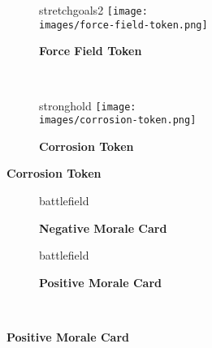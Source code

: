 \begin{figure}[H]
\begin{subfigure}[c]{0.15\linewidth}
\begin{expansionmini}{stretchgoals2}
      \texttt{[image: \\images/force-field-token.png]}
      \caption{\textbf{Force Field Token}}
    \end{expansionmini}
  \end{subfigure}
  ~
  \begin{subfigure}[c]{0.15\linewidth}
    \begin{expansionmini}{stronghold}
      \centering
      \vspace{0.5em}
      \texttt{[image: \\images/corrosion-token.png]}
      \caption{\textbf{Corrosion Token}}
    \end{expansionmini}
  \end{subfigure}
\end{figure}

\vspace*{-1em}
\begin{figure}[H]
  \centering
  \hfill
  \begin{subfigure}[c]{0.2\linewidth}
    \centering
    \vspace{1em}
    \caption{\textbf{}}
  \end{subfigure}
  \hfill
  \begin{subfigure}[c]{0.22\linewidth}
    \begin{expansionmini}{battlefield}
      \centering
      \caption{\textbf{Negative Morale Card}}
    \end{expansionmini}
  \end{subfigure}
  \hfill
  \begin{subfigure}[c]{0.22\linewidth}
    \begin{expansionmini}{battlefield}
      \centering
      \caption{\textbf{Positive Morale Card}}
    \end{expansionmini}
  \end{subfigure}
  \hfill
  ~
\end{figure}

